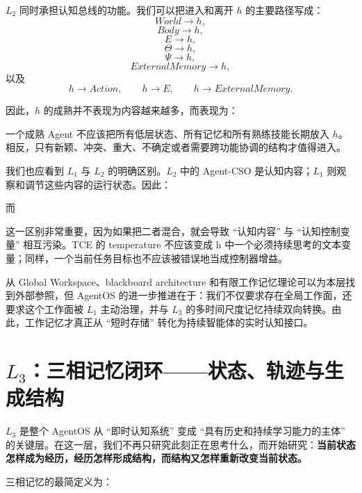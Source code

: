 $L_2$ 同时承担认知总线的功能。我们可以把进入和离开 $h$ 的主要路径写成：
\[
World\rightarrow h,
\]
\[
Body\rightarrow h,
\]
\[
E\rightarrow h,
\]
\[
\Theta\rightarrow h,
\]
\[
\Psi\rightarrow h,
\]
\[
ExternalMemory\rightarrow h,
\]
以及
\[
h\rightarrow Action,
\qquad
h\rightarrow E,
\qquad
h\rightarrow ExternalMemory.
\]

因此，$h$ 的成熟并不表现为内容越来越多，而表现为：
\begin{statementbox}
\centering
{}
\end{statementbox}
一个成熟 Agent 不应该把所有低层状态、所有记忆和所有熟练技能长期放入 $h$。相反，只有新颖、冲突、重大、不确定或者需要跨功能协调的结构才值得进入。

我们也应看到 $L_1$ 与 $L_2$ 的明确区别。$L_2$ 中的 Agent-CSO 是认知内容；$L_1$ 则观察和调节这些内容的运行状态。因此：
\begin{statementbox}
\centering
{}
\end{statementbox}
而
\begin{statementbox}
\centering
{}
\end{statementbox}

这一区别非常重要，因为如果把二者混合，就会导致 ``认知内容'' 与 ``认知控制变量'' 相互污染。TCE 的 temperature 不应该变成 h 中一个必须持续思考的文本变量；同样，一个当前任务目标也不应该被错误地当成控制器增益。

从 Global Workspace、blackboard architecture 和有限工作记忆理论可以为本层找到外部参照，但 AgentOS 的进一步推进在于：我们不仅要求存在全局工作面，还要求这个工作面被 $L_1$ 主动治理，并与 $L_3$ 的多时间尺度记忆持续双向转换。由此，工作记忆才真正从 ``短时存储'' 转化为持续智能体的实时认知接口。

\section{$L_3$：三相记忆闭环——状态、轨迹与生成结构}

$L_3$ 是整个 AgentOS 从 ``即时认知系统'' 变成 ``具有历史和持续学习能力的主体'' 的关键层。在这一层，我们不再只研究此刻正在思考什么，而开始研究：\textbf{当前状态怎样成为经历，经历怎样形成结构，而结构又怎样重新改变当前状态。}

三相记忆的最简定义为：
\begin{statementbox}
\centering
{}
\end{statementbox}

